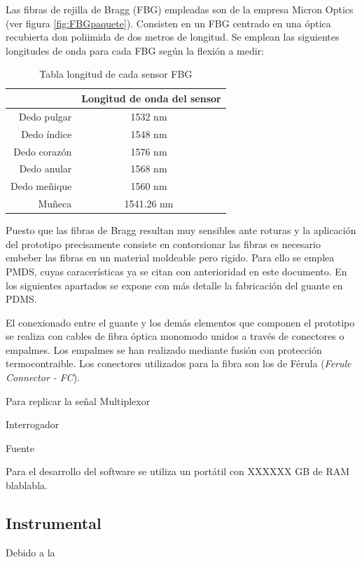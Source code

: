 Las fibras de rejilla de Bragg (FBG) empleadas son de la empresa Micron Optics (ver figura \ref{fig:FBGpaquete}). Consisten en un FBG centrado en una óptica recubierta don poliimida de dos metros de longitud. Se emplean las siguientes longitudes de onda para cada FBG según la flexión a medir:

\begin{table}[H]
	\centering
	\begin{tabular}[t]{|r|c|}
		\hline
		& Longitud de onda del sensor\\
		\hline
		\hline
		Dedo pulgar & 1532 nm \\
		\hline
		Dedo índice & 1548 nm \\
		\hline
		Dedo corazón & 1576 nm \\
		\hline
		Dedo anular & 1568 nm \\
		\hline
		Dedo meñique & 1560 nm \\
		\hline
		Muñeca & 1541.26 nm \\
		\hline
	\end{tabular}
	\caption{Tabla longitud de cada sensor FBG}
	\label{tabla:mmedidas 80 cm}
\end{table}

Puesto que las fibras de Bragg resultan muy sensibles ante roturas y la aplicación del prototipo precisamente consiste en contorsionar las fibras es necesario embeber las fibras en un material moldeable pero rigido. Para ello se emplea PMDS, cuyas caracerísticas ya se citan con anterioridad en este documento. En los siguientes apartados se expone con más detalle la fabricación del guante en PDMS. 

El conexionado entre el guante y los demás elementos que componen el prototipo se realiza con cables de fibra óptica monomodo unidos a través de conectores o empalmes. Los empalmes se han realizado mediante fusión con protección termocontraible. Los conectores utilizados para la fibra son los de Férula (\textit{Ferule Connector - FC}).


Para replicar la señal
Multiplexor

Interrogador

Fuente



Para el desarrollo del software se utiliza un portátil \textcolor{rositaoscuro}{con XXXXXX GB de RAM blablabla}. 


\subsection{Instrumental}
\label{sec:instrumental3}
Debido a la 

